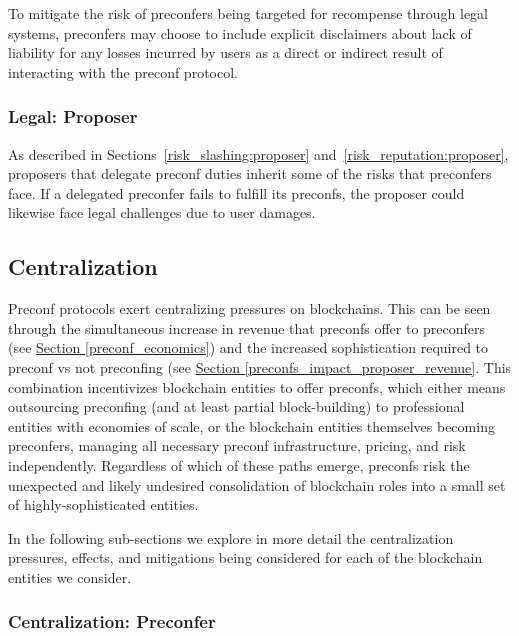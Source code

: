 \documentclass[a4paper]{article}
\theoremstyle{boldstyle}
\newcommand{\todocm}[1]{\todo[color=blue!40]{\textbf{Conor:} #1}}
\begin{document}
    To mitigate the risk of preconfers being targeted for recompense through legal systems, preconfers may choose to include explicit disclaimers about lack of liability for any losses incurred by users as a direct or indirect result of interacting with the preconf protocol.


    \subsubsection{Legal: Proposer}
    As described in Sections~\ref{risk_slashing:proposer} and~\ref{risk_reputation:proposer}, proposers that delegate preconf duties inherit some of the risks that preconfers face. If a delegated preconfer fails to fulfill its preconfs, the proposer could likewise face legal challenges due to user damages.
  

\subsection{Centralization} 
\label{risk_centralization}
Preconf protocols exert centralizing pressures on blockchains. This can be seen through the simultaneous increase in revenue that preconfs offer to preconfers (see \hyperref[preconf_economics]{Section \ref{preconf_economics}}) and the increased sophistication required to preconf vs not preconfing (see \hyperref[preconfs_impact_proposer_revenue]{Section \ref{preconfs_impact_proposer_revenue}}. %
This combination incentivizes blockchain entities to offer preconfs, which either means outsourcing preconfing (and at least partial block-building) to professional entities with economies of scale, or the blockchain entities themselves becoming preconfers, managing all necessary preconf infrastructure, pricing, and risk independently. Regardless of which of these paths emerge, preconfs risk the unexpected and likely undesired consolidation of blockchain roles into a small set of highly-sophisticated entities. 

In the following sub-sections we explore in more detail the centralization pressures, effects, and mitigations being considered for each of the blockchain entities we consider.

    \subsubsection{Centralization: Preconfer}
\end{document}
